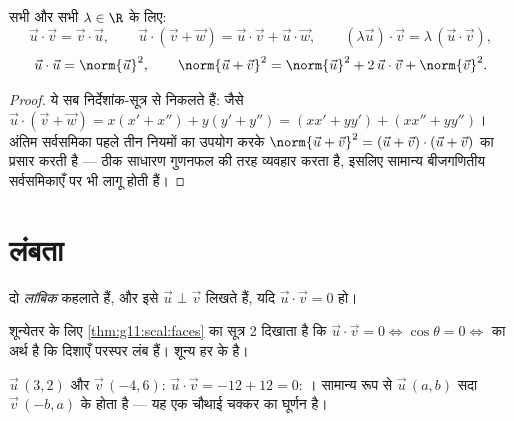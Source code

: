 \begin{proposition}[बीजगणितीय नियम]\label{prop:g11:scal:rules}
सभी  और सभी $\lambda \in \R$ के लिए:
\[
\vec u \cdot \vec v = \vec v \cdot \vec u, \qquad
\vec u \cdot (\vec v + \vec w) = \vec u \cdot \vec v + \vec u \cdot
\vec w, \qquad
(\lambda \vec u)\cdot \vec v = \lambda\,(\vec u \cdot \vec v),
\]
\[
\vec u \cdot \vec u = \norm{\vec u}^2,
\qquad
\norm{\vec u + \vec v}^2 = \norm{\vec u}^2 + 2\,\vec u\cdot\vec v +
\norm{\vec v}^2 .
\]
\end{proposition}

\begin{proof}
ये सब निर्देशांक-सूत्र से निकलते हैं: जैसे $\vec u \cdot (\vec v + \vec w) = x(x' + x'') + y(y' + y'') =
(xx' + yy') + (xx'' + yy'')$। अंतिम सर्वसमिका पहले तीन
नियमों का उपयोग करके $\norm{\vec u + \vec v}^2 = (\vec u + \vec v)\cdot(\vec u + \vec v)$ का प्रसार करती है ---  ठीक साधारण
गुणनफल की तरह व्यवहार करता है, इसलिए सामान्य बीजगणितीय सर्वसमिकाएँ  पर
भी लागू होती हैं।
\end{proof}

\section{लंबता}

\begin{definition}[लांबिक सदिश]\label{def:g11:scal:orthogonal}
दो  \emph{लांबिक} कहलाते हैं, और इसे $\vec u \perp \vec v$ लिखते हैं,
यदि $\vec u \cdot \vec v = 0$ हो।
\end{definition}

\begin{remark}
शून्येतर  के लिए \cref{thm:g11:scal:faces} का सूत्र 2 दिखाता है कि $\vec u \cdot \vec v = 0 \iff \cos\theta = 0 \iff$ का अर्थ है कि
दिशाएँ परस्पर लंब हैं। शून्य  हर  के  है।
\end{remark}

\begin{example}
$\vec u\,(3, 2)$ और $\vec v\,(-4, 6)$: $\vec u \cdot \vec v = -12 + 12 =
0$: । सामान्य रूप से $\vec u\,(a, b)$ सदा $\vec v\,(-b, a)$ के  होता है
--- यह एक चौथाई चक्कर का घूर्णन है।
\end{example}

